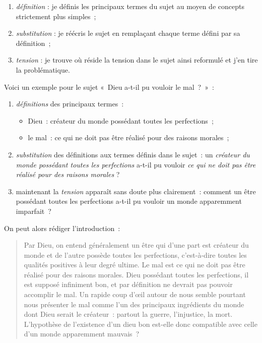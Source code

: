 \documentclass[a4paper]{article}
\begin{document}
\begin{enumerate}
\item \emph{définition} : je définis les principaux termes du sujet au moyen de
   concepts strictement plus simples ;
\item \emph{substitution} : je réécris le sujet en remplaçant chaque terme
   défini par sa définition ;
\item \emph{tension} : je trouve où réside la tension dans le sujet ainsi
   reformulé et j'en tire la problématique.
\end{enumerate}

Voici un exemple pour le sujet « Dieu a-t-il pu vouloir le mal ? » :

\begin{enumerate}
\item \emph{définitions} des principaux termes :
\begin{itemize}
\item Dieu : créateur du monde possédant toutes les perfections ;
\item le mal : ce qui ne doit pas être réalisé pour des raisons
      morales ;
\end{itemize}
\item \emph{substitution} des définitions aux termes définis dans le sujet : un
   \emph{créateur du monde possédant toutes les perfections} a-t-il pu
   vouloir \emph{ce qui ne doit pas être réalisé pour des raisons morales} ?
\item maintenant la \emph{tension} apparaît sans doute plus clairement : comment
   un être possédant toutes les perfections a-t-il pu vouloir un monde
   apparemment imparfait ?
\end{enumerate}

On peut alors rédiger l'introduction :

\begin{quote}
Par Dieu, on entend généralement un être qui d'une part est créateur
du monde et de l'autre possède toutes les perfections, c'est-à-dire
toutes les qualités positives à leur degré ultime. Le mal est ce qui
ne doit pas être réalisé pour des raisons morales. Dieu possédant
toutes les perfections, il est supposé infiniment bon, et par
définition ne devrait pas pouvoir accomplir le mal. Un rapide coup
d'œil autour de nous semble pourtant nous présenter le mal comme l'un
des principaux ingrédients du monde dont Dieu serait le créateur :
partout la guerre, l'injustice, la mort. L'hypothèse de l'existence
d'un dieu bon est-elle donc compatible avec celle d'un monde
apparemment mauvais ?
\end{quote}
\end{document}
